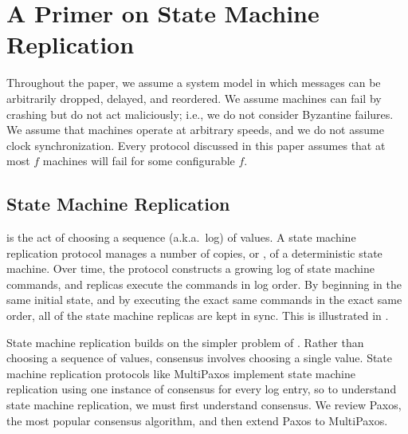 \section{A Primer on State Machine Replication}

Throughout the paper, we assume a system model in which messages can be
arbitrarily dropped, delayed, and reordered. We assume machines can fail by
crashing but do not act maliciously; i.e., we do not consider Byzantine
failures. We assume that machines operate at arbitrary speeds, and we do not
assume clock synchronization. Every protocol discussed in this paper assumes
that at most $f$ machines will fail for some configurable $f$.

\subsection{State Machine Replication}
 is the act of choosing a sequence (a.k.a.\
log) of values. A state machine replication protocol manages a number of
copies, or \defword{replicas}, of a deterministic state machine. Over time, the
protocol constructs a growing log of state machine commands, and replicas
execute the commands in log order. By beginning in the same initial state, and
by executing the exact same commands in the exact same order, all of the state
machine replicas are kept in sync. This is illustrated in \figref{LogOverTime}.

{}

State machine replication builds on the simpler problem of .
Rather than choosing a sequence of values, consensus involves choosing a single
value. State machine replication protocols like MultiPaxos implement state
machine replication using one instance of consensus for every log entry, so to
understand state machine replication, we must first understand consensus. We
review Paxos, the most popular consensus algorithm, and then extend Paxos to
MultiPaxos.

